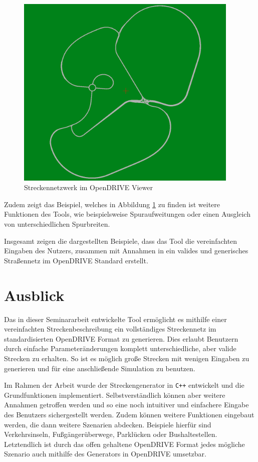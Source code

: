 \begin{figure}[H]
\flushleft
\includegraphics[width=0.95\textwidth]{fig/fig8.png}
\caption{Streckennetzwerk im OpenDRIVE Viewer}
\label{abb7}
\end{figure}

Zudem zeigt das Beispiel, welches in Abbildung \ref{abb7} zu finden ist weitere Funktionen des Tools, wie beispielsweise Spuraufweitungen oder einen Ausgleich von unterschiedlichen Spurbreiten.

Insgesamt zeigen die dargestellten Beispiele, dass das Tool die vereinfachten Eingaben des Nutzers, zusammen mit Annahmen in ein valides und generisches Straßennetz im OpenDRIVE Standard erstellt.

\chapter{Ausblick}

Das in dieser Seminararbeit entwickelte Tool ermöglicht es mithilfe einer vereinfachten Streckenbeschreibung ein vollständiges Streckennetz im standardisierten OpenDRIVE Format zu generieren. Dies erlaubt Benutzern durch einfache Parameteränderungen komplett unterschiedliche, aber valide Strecken zu erhalten. So ist es möglich große Strecken mit wenigen Eingaben zu generieren und für eine anschließende Simulation zu benutzen.

Im Rahmen der Arbeit wurde der Streckengenerator in \texttt{C++} entwickelt und die Grundfunktionen implementiert. Selbstverständlich können aber weitere Annahmen getroffen werden und so eine noch intuitiver und einfachere Eingabe des Benutzers sichergestellt werden. Zudem können weitere Funktionen eingebaut werden, die dann weitere Szenarien abdecken. Beispiele hierfür sind Verkehrsinseln, Fußgängerüberwege, Parklücken oder Bushaltestellen. Letztendlich ist durch das offen gehaltene OpenDRIVE Format jedes mögliche Szenario auch mithilfe des Generators in OpenDRIVE umsetzbar.

